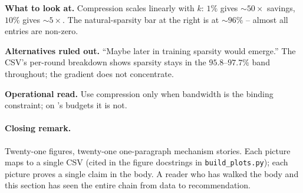 \textbf{What to look at.} Compression scales linearly with $k$:
$1\%$ gives $\sim$$50\!\times$ savings, $10\%$ gives
$\sim$$5\!\times$. The natural-sparsity bar at the right is at
$\sim$$96\%$ -- almost all entries are non-zero.

\textbf{Alternatives ruled out.} ``Maybe later in training
sparsity would emerge.'' The CSV's per-round breakdown shows
sparsity stays in the $95.8$--$97.7\%$ band throughout; the
gradient does not concentrate.

\textbf{Operational read.} Use compression only when bandwidth is
the binding constraint; on \mimic{}'s budgets it is not.

\paragraph{Closing remark.}
Twenty-one figures, twenty-one one-paragraph mechanism stories.
Each picture maps to a single CSV (cited in the figure docstrings
in \texttt{build\_plots.py}); each picture proves a single claim
in the body. A reader who has walked the body and this section
has seen the entire chain from data to recommendation.
